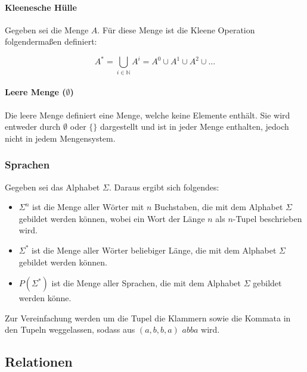 \documentclass[../main.tex]{subfiles}
\begin{document}
                \paragraph{Kleenesche Hülle}
                    Gegeben sei die Menge $A$. Für diese Menge ist die Kleene Operation folgendermaßen definiert:
                    
                    \begin{equation}
                        A^* = \bigcup_{i \in \mathbb{N} } A^i=A^0\cup A^1\cup A^2\cup ...
                    \end{equation}
                    
				\paragraph{Leere Menge ($\emptyset$)}
					Die leere Menge definiert eine Menge, welche keine Elemente enthält. Sie wird entweder durch $\emptyset$ oder $\{\}$ dargestellt und ist in jeder Menge enthalten, jedoch nicht in jedem Mengensystem.
                
            \subsubsection{Sprachen}
                Gegeben sei das Alphabet $\Sigma$. Daraus ergibt sich folgendes:
                
                \begin{itemize}
                    \item $\Sigma^n$ ist die Menge aller Wörter mit $n$ Buchstaben, die mit dem Alphabet $\Sigma$ gebildet werden können, wobei ein Wort der Länge $n$ als $n$-Tupel beschrieben wird.
                    \item $\Sigma^*$ ist die Menge aller Wörter beliebiger Länge, die mit dem Alphabet $\Sigma$ gebildet werden können.
                    \item $P\left(\Sigma^*\right)$ ist die Menge aller Sprachen, die mit dem Alphabet $\Sigma$ gebildet werden könne.
                \end{itemize}

                Zur Vereinfachung werden um die Tupel die Klammern sowie die Kommata in den Tupeln weggelassen, sodass aus $\left(a, b, b, a\right)$ $abba$ wird.
                    
        \subsection{Relationen}
\end{document}
